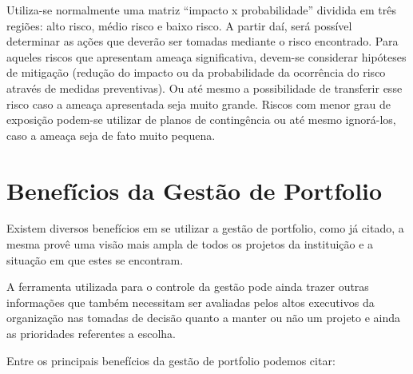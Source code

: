 \documentclass[12pt,a4paper,ruledheader,tocpage=prefix,floatnumber=continuous,pagestart=folhaderosto,font=times]{abnt}
\begin{document}
Utiliza-se normalmente uma matriz ``impacto x probabilidade'' dividida em três regiões: alto risco, médio risco e baixo risco. A partir daí, será possível 
determinar as ações que deverão ser tomadas mediante o risco encontrado. Para aqueles riscos que apresentam ameaça significativa, devem-se considerar hipóteses
de mitigação (redução do impacto ou da probabilidade da ocorrência do risco através de medidas preventivas). Ou até mesmo a possibilidade de transferir esse
risco caso a ameaça apresentada seja muito grande. Riscos com menor grau de exposição podem-se utilizar de planos de contingência ou até mesmo ignorá-los, caso
a ameaça seja de fato muito pequena.

\section{Benefícios da Gestão de Portfolio}
Existem diversos benefícios em se utilizar a gestão de portfolio, como já citado, a mesma provê uma visão mais ampla de todos os projetos da instituição 
e a situação em que estes se encontram.

A ferramenta utilizada para o controle da gestão pode ainda trazer outras informações que também necessitam ser avaliadas pelos altos executivos da 
organização nas tomadas de decisão quanto a manter ou não um projeto e ainda as prioridades referentes a escolha.

Entre os principais benefícios da gestão de portfolio podemos citar:
\end{document}
